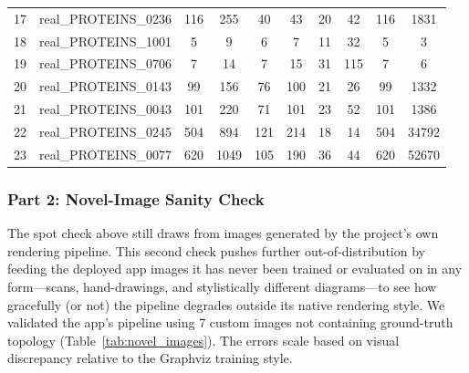 \documentclass[11pt,letterpaper]{article}
\numberwithin{equation}{section}
\numberwithin{figure}{section}
\numberwithin{table}{section}
\begin{document}
\begin{footnotesize}
\begin{longtable}{llcccccccc}
17 & real\_PROTEINS\_0236 & 116 & 255 & 40 & 43 & 20 & 42 & 116 & 1831 \\
18 & real\_PROTEINS\_1001 & 5 & 9 & 6 & 7 & 11 & 32 & 5 & 3 \\
19 & real\_PROTEINS\_0706 & 7 & 14 & 7 & 15 & 31 & 115 & 7 & 6 \\
20 & real\_PROTEINS\_0143 & 99 & 156 & 76 & 100 & 21 & 26 & 99 & 1332 \\
21 & real\_PROTEINS\_0043 & 101 & 220 & 71 & 101 & 23 & 52 & 101 & 1386 \\
22 & real\_PROTEINS\_0245 & 504 & 894 & 121 & 214 & 18 & 14 & 504 & 34792 \\
23 & real\_PROTEINS\_0077 & 620 & 1049 & 105 & 190 & 36 & 44 & 620 & 52670 \\
\end{longtable}
\end{footnotesize}

\subsubsection{Part 2: Novel-Image Sanity Check}
The spot check above still draws from images generated by the project's own rendering pipeline. This second check pushes further out-of-distribution by feeding the deployed app images it has never been trained or evaluated on in any form---scans, hand-drawings, and stylistically different diagrams---to see how gracefully (or not) the pipeline degrades outside its native rendering style. We validated the app's pipeline using 7 custom images not containing ground-truth topology (Table~\ref{tab:novel_images}). The errors scale based on visual discrepancy relative to the Graphviz training style.
\end{document}
